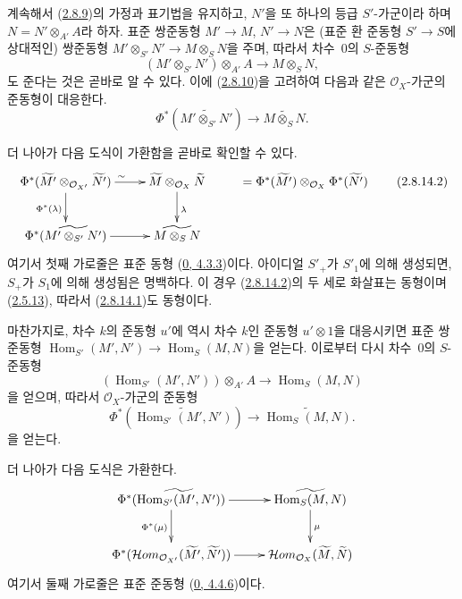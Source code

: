 
\begin{env}[2.8.14]
\label{II.2.8.14-ko}
계속해서 (\hyperref[II.2.8.9-ko]{2.8.9})의 가정과 표기법을 유지하고,
$N'$을 또 하나의 등급 $S'$-가군이라 하며
$N=N'\otimes_{A'}A$라 하자. 표준 쌍준동형 $M'\to M$, $N'\to N$은
(표준 환 준동형 $S'\to S$에 상대적인) 쌍준동형
$M'\otimes_{S'}N'\to M\otimes_S N$을 주며, 따라서 차수~$0$의
$S$-준동형
\[
  (M'\otimes_{S'}N')\otimes_{A'}A\longrightarrow M\otimes_S N,
\]
도 준다는 것은 곧바로 알 수 있다. 이에
(\hyperref[II.2.8.10-ko]{2.8.10})을 고려하여 다음과 같은
$\mathcal{O}_X$-가군의 준동형이 대응한다.
\[
\label{II.2.8.14.1-ko}
  \Phi^*(\widetilde{M'\otimes_{S'}N'})
  \longrightarrow\widetilde{M\otimes_S N}.
\tag{2.8.14.1}
\]

더 나아가 다음 도식이 가환함을 곧바로 확인할 수 있다.
\[
\label{II.2.8.14.2-ko}
  \xymatrix{
    \Phi^*(\widetilde{M'}\otimes_{\mathcal{O}_{X'}}\widetilde{N'})
      \ar[r]^{\sim}\ar[d]_{\Phi^*(\lambda)}
    & \widetilde{M}\otimes_{\mathcal{O}_X}\widetilde{N}
      \ar[d]^{\lambda}
    & =\Phi^*(\widetilde{M'})\otimes_{\mathcal{O}_X}
      \Phi^*(\widetilde{N'})\\
    \Phi^*(\widetilde{M'\otimes_{S'}N'})\ar[r]
    & \widetilde{M\otimes_S N}
  }
\tag{2.8.14.2}
\]
여기서 첫째 가로줄은 표준 동형
(\hyperref[0.4.3.3-ko]{0, 4.3.3})이다. 아이디얼 $S'_+$가
$S'_1$에 의해 생성되면, $S_+$가 $S_1$에 의해 생성됨은 명백하다.
이 경우 (\hyperref[II.2.8.14.2-ko]{2.8.14.2})의 두 세로 화살표는
동형이며(\hyperref[II.2.5.13-ko]{2.5.13}), 따라서
(\hyperref[II.2.8.14.1-ko]{2.8.14.1})도 동형이다.

마찬가지로, 차수 $k$의 준동형 $u'$에 역시 차수 $k$인 준동형
$u'\otimes1$을 대응시키면 표준 쌍준동형
$\operatorname{Hom}_{S'}(M',N')\to\operatorname{Hom}_S(M,N)$을 얻는다.
이로부터 다시 차수~$0$의 $S$-준동형
\[
  (\operatorname{Hom}_{S'}(M',N'))\otimes_{A'}A
  \longrightarrow\operatorname{Hom}_S(M,N)
\]
을 얻으며, 따라서 $\mathcal{O}_X$-가군의 준동형
\[
\label{II.2.8.14.3-ko}
  \Phi^*(\widetilde{\operatorname{Hom}_{S'}(M',N')})
  \longrightarrow\widetilde{\operatorname{Hom}_S(M,N)}.
\tag{2.8.14.3}
\]
을 얻는다.

더 나아가 다음 도식은 가환한다.
\[
  \xymatrix{
    \Phi^*(\widetilde{\operatorname{Hom}_{S'}(M',N')})\ar[r]
      \ar[d]_{\Phi^*(\mu)}
    & \widetilde{\operatorname{Hom}_S(M,N)}\ar[d]^{\mu}\\
    \Phi^*(\mathcal{H}om_{\mathcal{O}_{X'}}
      (\widetilde{M'},\widetilde{N'}))\ar[r]
    & \mathcal{H}om_{\mathcal{O}_X}(\widetilde{M},\widetilde{N})
  }
\]
여기서 둘째 가로줄은 표준 준동형
(\hyperref[0.4.4.6-ko]{0, 4.4.6})이다.
\end{env}

